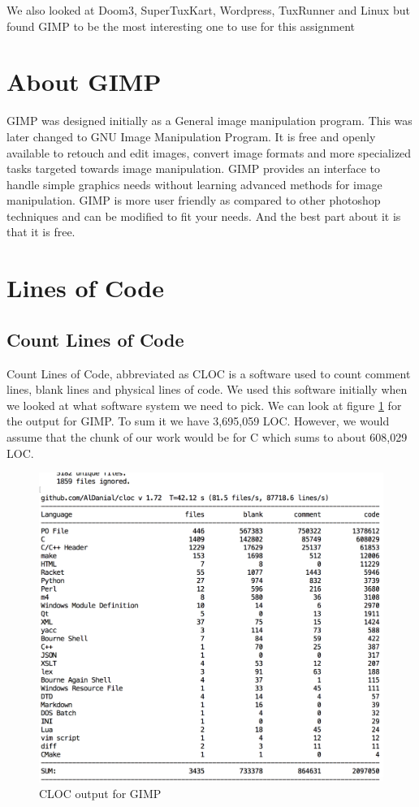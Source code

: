 We also looked at Doom3, SuperTuxKart, Wordpress, TuxRunner and Linux but found GIMP to be the most interesting one to use for this assignment
\section{About GIMP}
GIMP was designed initially as a General image manipulation program. This was later changed to GNU Image Manipulation Program. It is free and openly available to retouch and edit images, convert image formats and more specialized tasks targeted towards image manipulation. GIMP provides an interface to handle simple graphics needs without learning advanced methods for image manipulation. GIMP is more user friendly as compared to other photoshop techniques and can be modified to fit your needs. And the best part about it is that it is free.
\section{Lines of Code}
\subsection{Count Lines of Code}
Count Lines of Code\cite{cloc}, abbreviated as CLOC is a software used to count comment lines, blank lines and physical lines of code. We used this software initially when we looked at what software system we need to pick. We can look at figure \ref{fig:clocgimp} for the output for GIMP. To sum it we have 3,695,059 LOC. However, we would assume that the chunk of our work would be for C which sums to about 608,029 LOC.  
\begin{figure}
\centering
\includegraphics[width=1\textwidth]{clocgimp.png}
\caption{\label{fig:clocgimp}CLOC output for GIMP}
\end{figure}
